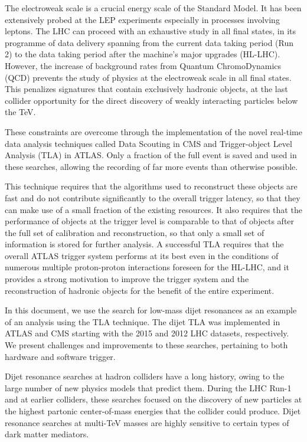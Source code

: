 \documentclass[a4paper,justified]{tufte-handout}
\begin{document}
The electroweak scale is a crucial energy scale of the Standard Model. It has been extensively probed at the LEP experiments especially in processes involving leptons. The LHC can proceed with an exhaustive study in all final states, in its programme of data delivery spanning from the current data taking period (Run 2) to the data taking period after the machine's major upgrades (HL-LHC).  However, the increase of background rates from Quantum ChromoDynamics (QCD) prevents the study of physics at the electroweak scale in all final states. This penalizes signatures that contain exclusively hadronic objects, at the last collider opportunity for the direct discovery of weakly interacting  particles below the TeV. 

These constraints are overcome through the implementation of the novel real-time data analysis techniques called Data Scouting in CMS and Trigger-object Level Analysis (TLA) in ATLAS. Only a fraction of the full event is saved and used in these searches, allowing the recording of far more events than otherwise possible. 

This technique requires that the algorithms used to reconstruct these objects are fast and do not contribute significantly to the overall trigger latency, so that they can make use of a small fraction of the existing resources. It also requires that the performance of objects at the trigger level is comparable to that of objects after the full set of calibration and reconstruction, so that only a small set of information is stored for further analysis. A successful TLA requires that the overall ATLAS trigger system performs at its best even in the conditions of numerous multiple proton-proton interactions foreseen for the HL-LHC, and it provides a strong motivation to improve the trigger system and the reconstruction of hadronic objects for the benefit of the entire experiment.

In this document, we use the search for low-mass dijet resonances as an example of an analysis using the TLA technique. The dijet TLA was implemented in ATLAS and CMS starting with the 2015 and 2012 LHC datasets, respectively. We present challenges and improvements to these searches, pertaining to both hardware and software trigger. 

Dijet resonance searches at hadron colliders have a long history, owing to the large number of new physics models that predict them. During the LHC Run-1 and at earlier colliders, these searches focused on the discovery of new particles at the highest partonic center-of-mass energies that the collider could produce. Dijet resonance searches at multi-TeV masses are highly sensitive to certain types of dark matter mediators.
\end{document}
